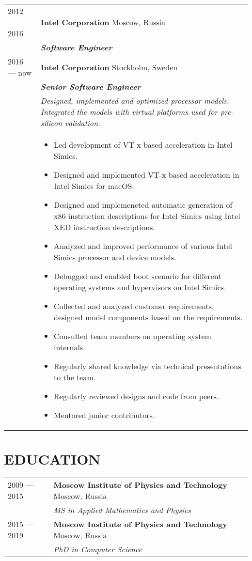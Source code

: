 ﻿\documentclass[12pt, a4paper, oneside]{article}
\begin{document}
\begin{table}[htpb]
  \begin{tabularx}{\textwidth}{lY}
    2012 --- 2016 & \textbf{Intel Corporation} \hfill Moscow, Russia \\
    & \textbf{\textit{Software Engineer}} \\
    2016 --- now  & \textbf{Intel Corporation} \hfill Stockholm, Sweden \\
    & \textbf{\textit{Senior Software Engineer}} \\
    & \textit{Designed, implemented and optimized processor models. Integrated
    the models with virtual platforms used for pre-silicon validation.} \\
    & \begin{itemize}
      \item Led development of VT-x based acceleration in Intel Simics.
      \item Designed and implemented VT-x based acceleration in Intel Simics
        for macOS.
      \item Designed and implemeneted automatic generation of x86 instruction
        descriptions for Intel Simics using Intel XED instruction descriptions.
      \item Analyzed and improved performance of various Intel Simics processor
        and device models.
      \item Debugged and enabled boot scenario for different operating systems
        and hypervisors on Intel Simics.
      \item Collected and analyzed customer requirements, designed model
        components based on the requirements.
      \item Consulted team members on operating system internals.
      \item Regularly shared knowledge via technical presentations to the team.
      \item Regularly reviewed designs and code from peers.
      \item Mentored junior contributors.
      \end{itemize} \\
  \end{tabularx}
\end{table}

\section*{EDUCATION}

\begin{table}[htpb]
  \begin{tabularx}{\textwidth}{lY}
    2009 --- 2015 & \textbf{Moscow Institute of Physics and Technology} \hfill Moscow, Russia \\
    & \textit{MS in Applied Mathematics and Physics} \\
    2015 --- 2019 & \textbf{Moscow Institute of Physics and Technology} \hfill Moscow, Russia \\
    & \textit{PhD in Computer Science} \\
  \end{tabularx}
\end{table}
\end{document}
